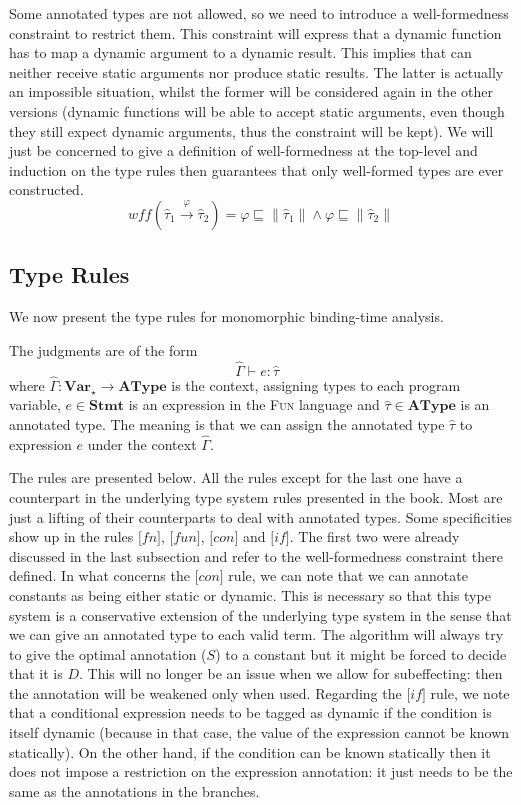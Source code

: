 \documentclass[a4wide,12pt]{article}
\theoremstyle{definition}
\theoremstyle{plain}
\theoremstyle{remark}
\def\Stmt {\mathbf{Stmt}}
\def\Var {\mathbf{Var}}
\def\AType{\mathbf{AType}}
\def\sqleq{\sqsubseteq}
\def\htau{\hat{\tau}}
\def\HGamma{\hat{\Gamma}}
\def\judge#1#2#3{#1 \vdash #2 : #3\;\;}
\def\annot#1{\|#1\|}
\begin{document}
Some annotated types are not allowed, so we need to introduce a well-formedness
constraint to restrict them. This constraint will express that a dynamic function
has to map a dynamic argument to a dynamic result. This implies that
can neither receive static arguments nor produce static results. The latter is actually
an impossible situation, whilst the former will be considered again in the other versions
(dynamic functions will be able to accept static arguments, even though they still expect dynamic arguments,
thus the constraint will be kept).
We will just be concerned to give a definition of well-formedness at the top-level and
induction on the type rules then guarantees that only
well-formed types are ever constructed.
\[
wff(\htau_1 \overset{\varphi}{\to} \htau_2) 
= \varphi \sqleq \annot{\htau_1}
 \land   \varphi \sqleq \annot{\htau_2}
\]

\subsection{Type Rules}

We now present the type rules for monomorphic binding-time analysis.

The judgments are of the form
\[\judge{\HGamma}{e}{\htau}\]
where $\HGamma: \Var_\star \to \AType$ is the context, assigning types to each program variable, 
$e \in \Stmt$ is an expression in the \textsc{Fun} language and $\htau \in \AType$ is an annotated type.
The meaning is that we can assign the annotated type $\htau$ to expression $e$ under the context $\HGamma$. 


The rules are presented below. All the rules except for the last one
have a counterpart in the underlying type system rules presented in the book.
Most are just a lifting of their counterparts to deal with annotated types.
Some specificities show up in the rules
$\lbrack fn \rbrack$,
$\lbrack fun \rbrack$,
$\lbrack con \rbrack$ and
$\lbrack if \rbrack$. 
The first two were already discussed in the last subsection and refer to 
the well-formedness constraint there defined.
In what concerns the $\lbrack con \rbrack$ rule, we can note that we can annotate constants 
as being either static or dynamic. This is necessary so that this type system
is a conservative extension of the underlying type system in the sense that 
we can give an annotated type to each valid term. The algorithm will always try to give the
optimal annotation ($S$) to a constant but it might be forced to decide that it is $D$. 
This will no longer be an issue when we allow for subeffecting: then the annotation will be weakened
only when used. Regarding the $\lbrack if \rbrack$ rule, we note that a conditional expression
needs to be tagged as dynamic if the condition is itself dynamic (because in that case,
the value of the expression cannot be known statically). On the other hand, if the condition
can be known statically then it does not impose a restriction on the expression annotation: it
just needs to be the same as the annotations in the branches.
\end{document}
